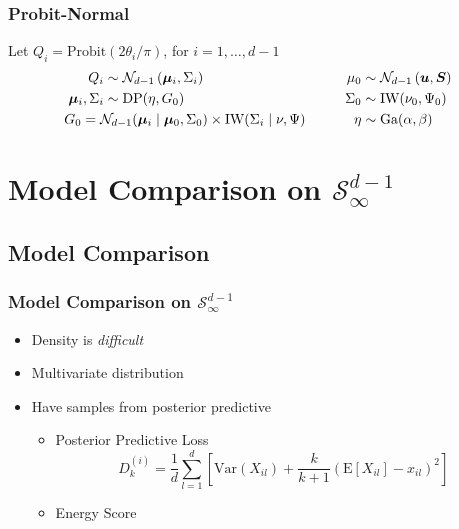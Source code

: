 \documentclass[aspectratio=169]{beamer}
\begin{document}
\begin{frame}
  \frametitle{Probit-Normal}
  Let $Q_i = \text{Probit}(2\theta_i / \pi)$, for $i = 1,\ldots,d-1$
  \begin{equation*}
    \begin{aligned}
                Q_i &\sim \mathcal{N}_{d-1}\left(\bm{\mu}_i, \Sigma_i\right)\\
    \bm{\mu}_i, \Sigma_i &\sim \text{DP}(\eta, G_0)\\
                    &\hspace{-1cm}G_0 =
                      \mathcal{N}_{d-1}(\bm{\mu}_i\mid\bm{\mu}_0,\Sigma_0)\times \text{IW}(\Sigma_i\mid\nu,\Psi)
    \end{aligned}
    \hspace{1cm}
    \begin{aligned}
              \mu_0 &\sim \mathcal{N}_{d-1}\left(\bm{u},\bm{S}\right)\\
           \Sigma_0 &\sim \text{IW}(\nu_0,\Psi_0)\\
               \eta &\sim \text{Ga}(\alpha, \beta)
    \end{aligned}
  \end{equation*}
\end{frame}

\section[Model Comparison]{Model Comparison on $\mathcal{S}_{\infty}^{d-1}$}
\subsection{Model Comparison}
\begin{frame}
  \frametitle{Model Comparison on $\mathcal{S}_{\infty}^{d-1}$}
  \begin{itemize}
      \item Density is \emph{difficult}
      \item Multivariate distribution
      \item Have samples from posterior predictive
      \begin{itemize}
            \item Posterior Predictive Loss~\citep{gelfand1998}
                \begin{equation*}
                    D_k^{(i)} = \frac{1}{d}\sum_{l = 1}^{d}\left[\text{Var}(X_{il}) +
                        \frac{k}{k+1}\left(\text{E}[X_{il}] - x_{il}\right)^2\right]
                \end{equation*}
            \item Energy Score~\cite{gneiting2007}
      \end{itemize}
  \end{itemize}
\end{frame}
\end{document}
